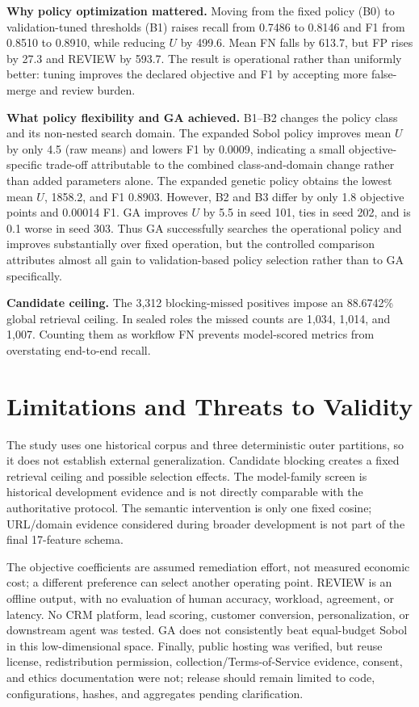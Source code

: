 \documentclass[conference]{IEEEtran}
\begin{document}
\textbf{Why policy optimization mattered.} Moving from the fixed policy (B0) to validation-tuned thresholds (B1) raises recall from 0.7486 to 0.8146 and F1 from 0.8510 to 0.8910, while reducing $U$ by 499.6. Mean FN falls by 613.7, but FP rises by 27.3 and REVIEW by 593.7. The result is operational rather than uniformly better: tuning improves the declared objective and F1 by accepting more false-merge and review burden.

\textbf{What policy flexibility and GA achieved.} B1--B2 changes the policy class and its non-nested search domain. The expanded Sobol policy improves mean $U$ by only 4.5 (raw means) and lowers F1 by 0.0009, indicating a small objective-specific trade-off attributable to the combined class-and-domain change rather than added parameters alone. The expanded genetic policy obtains the lowest mean $U$, 1858.2, and F1 0.8903. However, B2 and B3 differ by only 1.8 objective points and 0.00014 F1. GA improves $U$ by 5.5 in seed 101, ties in seed 202, and is 0.1 worse in seed 303. Thus GA successfully searches the operational policy and improves substantially over fixed operation, but the controlled comparison attributes almost all gain to validation-based policy selection rather than to GA specifically.

\textbf{Candidate ceiling.} The 3,312 blocking-missed positives impose an 88.6742\% global retrieval ceiling. In sealed roles the missed counts are 1,034, 1,014, and 1,007. Counting them as workflow FN prevents model-scored metrics from overstating end-to-end recall.

\section{Limitations and Threats to Validity}
The study uses one historical corpus and three deterministic outer partitions, so it does not establish external generalization. Candidate blocking creates a fixed retrieval ceiling and possible selection effects. The model-family screen is historical development evidence and is not directly comparable with the authoritative protocol. The semantic intervention is only one fixed cosine; URL/domain evidence considered during broader development is not part of the final 17-feature schema.

The objective coefficients are assumed remediation effort, not measured economic cost; a different preference can select another operating point. REVIEW is an offline output, with no evaluation of human accuracy, workload, agreement, or latency. No CRM platform, lead scoring, customer conversion, personalization, or downstream agent was tested. GA does not consistently beat equal-budget Sobol in this low-dimensional space. Finally, public hosting was verified, but reuse license, redistribution permission, collection/Terms-of-Service evidence, consent, and ethics documentation were not; release should remain limited to code, configurations, hashes, and aggregates pending clarification.
\end{document}
